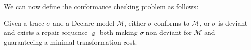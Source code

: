 We can now define the conformance checking problem as follows:
\begin{definition}
Given a trace $\sigma$ and a Declare model $\mathcal{M}$, either $\sigma$ conforms to $\mathcal{M}$, or $\sigma$ is deviant and  exists a repair sequence $\varrho$ both making $\sigma$ non-deviant for $\mathcal{M}$ and guaranteeing a minimal transformation cost.
\end{definition}

%

